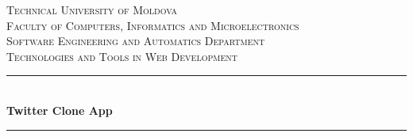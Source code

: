 \begin{titlepage}

  \begin{center} %

  \textsc{\large Technical University of Moldova}\\[0.5cm]
  \textsc{\large Faculty of Computers, Informatics and Microelectronics}\\[0.5cm]
  \textsc{\large Software Engineering and Automatics Department}\\[1.2cm] 
  \vspace{25 mm}
  \textsc{\Large Technologies and Tools in Web Development}\\[0.5cm] 

  \newcommand{\HRule}{\rule{\linewidth}{0.5mm}} %

  \vspace{10 mm}
  \HRule \\[0.4cm]
  { \LARGE \bfseries Twitter Clone App}\\[0.4cm] %
  \HRule \\[1.5cm]

      \vspace{30mm}


\end{center}
\end{titlepage}
